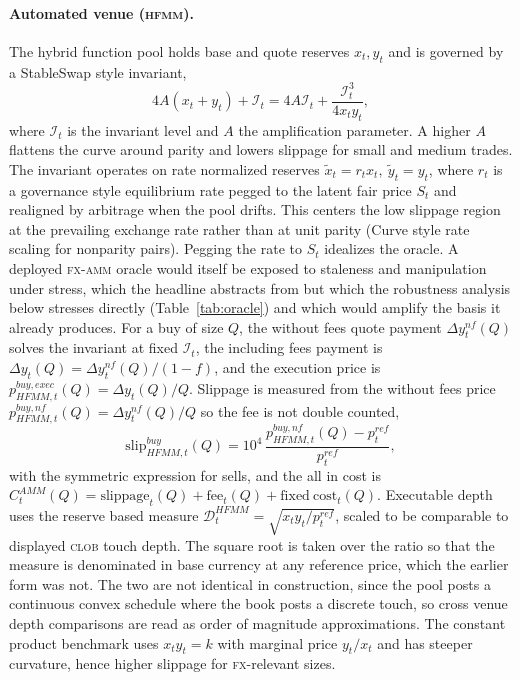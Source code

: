 \documentclass[a4paper,fleqn]{cas-sc}
\newcommand{\acro}[1]{\textsc{\MakeLowercase{#1}}\xspace}
\newcommand{\FX}{\acro{FX}}
\newcommand{\CLOB}{\acro{CLOB}}
\newcommand{\AMM}{\acro{AMM}}
\newcommand{\HFMM}{\acro{HFMM}}
\begin{document}
\paragraph{Automated venue (\HFMM{}).}
The hybrid function pool holds base and quote reserves \(x_t,y_t\) and is governed by a StableSwap style invariant,
\begin{equation}
4A(x_t+y_t)+\mathcal{I}_t=4A\mathcal{I}_t+\frac{\mathcal{I}_t^3}{4x_ty_t},
\end{equation}
where \(\mathcal{I}_t\) is the invariant level and \(A\) the amplification parameter. A higher \(A\) flattens the curve around parity and lowers slippage for small and medium trades. The invariant operates on rate normalized reserves \(\tilde x_t=r_t x_t,\ \tilde y_t=y_t\), where \(r_t\) is a governance style equilibrium rate pegged to the latent fair price \(S_t\) and realigned by arbitrage when the pool drifts. This centers the low slippage region at the prevailing exchange rate rather than at unit parity (Curve style rate scaling for nonparity pairs). Pegging the rate to \(S_t\) idealizes the oracle. A deployed \FX{}-\AMM{} oracle would itself be exposed to staleness and manipulation under stress, which the headline abstracts from but which the robustness analysis below stresses directly (Table~\ref{tab:oracle}) and which would amplify the basis it already produces. For a buy of size \(Q\), the without fees quote payment \(\Delta y^{nf}_t(Q)\) solves the invariant at fixed \(\mathcal{I}_t\), the including fees payment is \(\Delta y_t(Q)=\Delta y^{nf}_t(Q)/(1-f)\), and the execution price is \(p^{buy,exec}_{HFMM,t}(Q)=\Delta y_t(Q)/Q\). Slippage is measured from the without fees price \(p^{buy,nf}_{HFMM,t}(Q)=\Delta y^{nf}_t(Q)/Q\) so the fee is not double counted,
\begin{equation}
\mathrm{slip}^{buy}_{HFMM,t}(Q)=10^4\,\frac{p^{buy,nf}_{HFMM,t}(Q)-p^{ref}_t}{p^{ref}_t},
\end{equation}
with the symmetric expression for sells, and the all in cost is \(C^{AMM}_t(Q)=\mathrm{slippage}_t(Q)+\mathrm{fee}_t(Q)+\mathrm{fixed\ cost}_t(Q)\). Executable depth uses the reserve based measure \(\mathcal{D}^{HFMM}_t=\sqrt{x_ty_t/p^{ref}_t}\), scaled to be comparable to displayed \CLOB{} touch depth. The square root is taken over the ratio so that the measure is denominated in base currency at any reference price, which the earlier form was not. The two are not identical in construction, since the pool posts a continuous convex schedule where the book posts a discrete touch, so cross venue depth comparisons are read as order of magnitude approximations. The constant product benchmark uses \(x_ty_t=k\) with marginal price \(y_t/x_t\) and has steeper curvature, hence higher slippage for \FX{}-relevant sizes.
\end{document}
